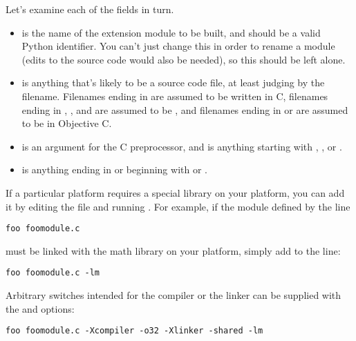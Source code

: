 \documentclass{howto}
\begin{document}
Let's examine each of the fields in turn.

\begin{itemize}

\item {} is the name of the extension module to be built,
      and should be a valid Python identifier.  You can't just change
      this in order to rename a module (edits to the source code would
      also be needed), so this should be left alone.

\item {} is anything that's likely to be a source code
      file, at least judging by the filename.  Filenames ending in
       are assumed to be written in C, filenames ending in
      , , and  are assumed to be
      \Cpp, and filenames ending in  or  are
      assumed to be in Objective C.

\item {} is an argument for the C preprocessor, 
      and is anything starting with , ,
       or .

\item {} is anything ending in  or beginning with
       or .
\end{itemize}

If a particular platform requires a special library on your platform,
you can add it by editing the  file and running
.  For example, if the module defined by the line

\begin{verbatim}
foo foomodule.c
\end{verbatim}

must be linked with the math library  on your platform,
simply add  to the line:

\begin{verbatim}
foo foomodule.c -lm
\end{verbatim}

Arbitrary switches intended for the compiler or the linker can be
supplied with the   and
  options:

\begin{verbatim}
foo foomodule.c -Xcompiler -o32 -Xlinker -shared -lm
\end{verbatim}
\end{document}

